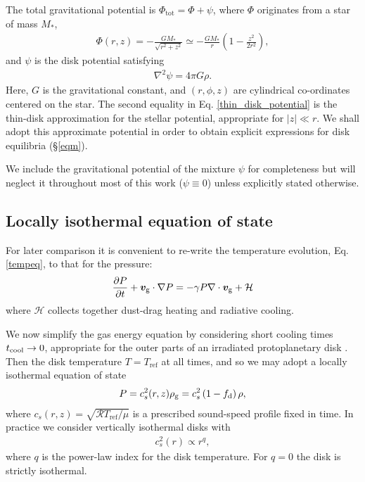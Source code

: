 The total gravitational potential is $\Phi_\mathrm{tot}=\Phi + \psi$,
where $\Phi$ originates from a star of mass $M_*$, 
\begin{align}\label{thin_disk_potential}
  \Phi(r,z) =-\frac{GM_*}{\sqrt{r^2 + z^2}}\simeq
  -\frac{GM_*}{r}\left(1 - \frac{z^2}{2r^2}\right), 
\end{align}
and $\psi$ is the disk potential satisfying
\begin{align}
  \nabla^2\psi = 4 \pi G \rho.
\end{align}
Here, $G$ is the gravitational constant, and $(r,\phi, z)$ are 
cylindrical co-ordinates centered on the star.  
The second equality in Eq. \ref{thin_disk_potential} is the 
thin-disk approximation for the stellar potential, appropriate for
$|z|\ll r$. We shall adopt this approximate potential in order to
obtain explicit expressions for disk equilibria (\S\ref{eqm}). 

We include the gravitational potential of the mixture 
$\psi$ for completeness but will neglect it throughout most of this
work ($\psi \equiv 0$) unless explicitly stated otherwise.   
 
\subsection{Locally isothermal equation of state}\label{loc_iso_eos}
For later comparison it is convenient to re-write the temperature
evolution, Eq. \ref{tempeq}, to that for the pressure: 
\begin{align}
  \frac{\partial P}{\partial t} + \bm{v}_\mathrm{g}\cdot\nabla P = - \gamma P
  \nabla\cdot \bm{v}_\mathrm{g}  + \mathcal{H} 
\end{align}
where $\mathcal{H}$ collects together dust-drag heating and radiative
cooling. 

We now simplify the gas energy equation by considering short cooling 
times $t_\mathrm{cool}\to 0$, appropriate for the outer parts of an irradiated
protoplanetary disk \citep{chiang97,lin15}. Then the disk temperature
$T = T_\mathrm{ref}$ at all times, and so we may
adopt a locally isothermal equation of state 
\begin{align}\label{eos}
  P = c_s^2(r,z)\rho_\mathrm{g} = c_s^{2}\left(1 - f_\mathrm{d}\right)\rho,   
\end{align}
where $c_s(r,z)= \sqrt{\mathcal{R}T_\mathrm{ref}/\mu}$ is a prescribed
sound-speed profile fixed in time. In practice we consider vertically 
isothermal disks with \begin{align}\label{power_temp}
  c_s^2(r) \propto r^{q},
\end{align}
where $q$ is the power-law index for the disk temperature. For $q=0$
the disk is strictly isothermal.  

